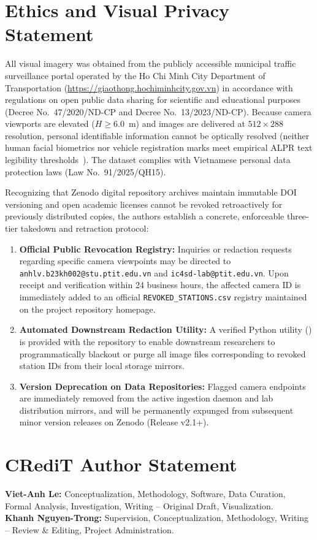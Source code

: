 \documentclass[preprint,12pt]{elsarticle}
\begin{document}
\section{Ethics and Visual Privacy Statement}
All visual imagery was obtained from the publicly accessible municipal traffic surveillance portal operated by the Ho Chi Minh City Department of Transportation (\url{https://giaothong.hochiminhcity.gov.vn}) in accordance with regulations on open public data sharing for scientific and educational purposes (Decree No.~47/2020/ND-CP and Decree No.~13/2023/ND-CP). Because camera viewports are elevated ($H \ge 6.0$~m) and images are delivered at $512 \times 288$ resolution, personal identifiable information cannot be optically resolved (neither human facial biometrics nor vehicle registration marks meet empirical ALPR text legibility thresholds~\cite{du2013automatic}). The dataset complies with Vietnamese personal data protection laws (Law No.~91/2025/QH15).

Recognizing that Zenodo digital repository archives maintain immutable DOI versioning and open academic licenses cannot be revoked retroactively for previously distributed copies, the authors establish a concrete, enforceable three-tier takedown and retraction protocol:
\begin{enumerate}
    \item \textbf{Official Public Revocation Registry:} Inquiries or redaction requests regarding specific camera viewpoints may be directed to \texttt{anhlv.b23kh002@stu.ptit.edu.vn} and \texttt{ic4sd-lab@ptit.edu.vn}. Upon receipt and verification within 24 business hours, the affected camera ID is immediately added to an official \texttt{REVOKED\_STATIONS.csv} registry maintained on the project repository homepage.
    \item \textbf{Automated Downstream Redaction Utility:} A verified Python utility () is provided with the repository to enable downstream researchers to programmatically blackout or purge all image files corresponding to revoked station IDs from their local storage mirrors.
    \item \textbf{Version Deprecation on Data Repositories:} Flagged camera endpoints are immediately removed from the active ingestion daemon and lab distribution mirrors, and will be permanently expunged from subsequent minor version releases on Zenodo (Release v2.1+).
\end{enumerate}

\section{CRediT Author Statement}
\textbf{Viet-Anh Le:} Conceptualization, Methodology, Software, Data Curation, Formal Analysis, Investigation, Writing -- Original Draft, Visualization. \\
\textbf{Khanh Nguyen-Trong:} Supervision, Conceptualization, Methodology, Writing -- Review \& Editing, Project Administration.
\end{document}

